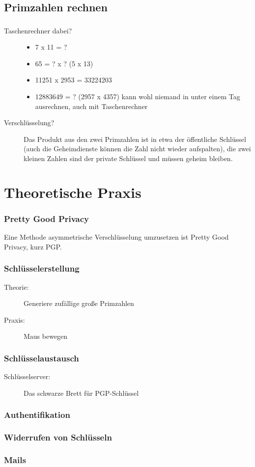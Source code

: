 \documentclass[compress]{beamer}
\begin{document}
\subsection{Primzahlen rechnen}
\begin{frame}
  \frametitle{\insertsubsection}
  \begin{description}
  \item[Taschenrechner dabei?]
    \begin{itemize}
    \item 7 x 11 = ?
    \item 65 = ? x ? (5 x 13)
    \item 11251 x 2953 = 33224203
    \item 12883649 = ? (2957 x 4357) kann wohl niemand in unter einem
      Tag ausrechnen, auch mit Taschenrechner
    \end{itemize}
  \item[Verschlüsselung?] Das Produkt aus den zwei Primzahlen ist in
    etwa der öffentliche Schlüssel (auch die Geheimdienste können die
    Zahl nicht wieder aufspalten), die zwei kleinen Zahlen sind der
    private Schlüssel und müssen geheim bleiben.
  \end{description}
\end{frame}

\section{Theoretische Praxis}
\label{sec-1-1-4}

\begin{frame}
    \frametitle{Pretty Good Privacy}
    Eine Methode asymmetrische Verschlüsselung umzusetzen ist
    \alert{P}retty \alert{G}ood \alert{P}rivacy, kurz PGP.
\end{frame}
\begin{frame}
    \frametitle{Schlüsselerstellung}
    \begin{description}
        \item[Theorie:] Generiere zufällige große Primzahlen
        \item[Praxis:] Maus bewegen
    \end{description}
\end{frame}
\begin{frame}
    \frametitle{Schlüsselaustausch}
    \begin{description}
        \item[Schlüsselserver: ] Das schwarze Brett für PGP-Schlüssel
    \end{description}
\end{frame}
\begin{frame}
    \frametitle{Authentifikation}
\end{frame}
\begin{frame}
    \frametitle{Widerrufen von Schlüsseln}
\end{frame}
\begin{frame}
    \frametitle{Mails}
\end{frame}
\end{document}
